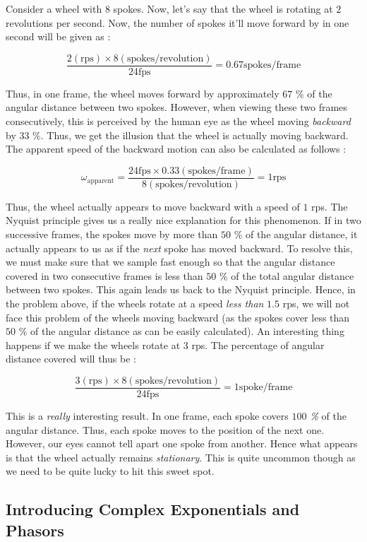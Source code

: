 \documentclass{article}
\theoremstyle{definition}
\begin{document}
		Consider a wheel with $8$ spokes. Now, let's say that the wheel is rotating at $2$ revolutions per second. Now, the number of spokes it'll move forward by in one second will be given as :
		
		\[ \frac{2(\text{rps}) \times 8(\text{spokes/revolution})}{24 \text{fps}} = 0.67 \text{spokes/frame} \]
		
		Thus, in one frame, the wheel moves forward by approximately $67$ \% of the angular distance between two spokes. However, when viewing these two frames consecutively, this is perceived by the human eye as the wheel moving \textit{backward} by $33$ \%. Thus, we get the illusion that the wheel is actually moving backward. The apparent speed of the backward motion can also be calculated as follows : 

\[ 
	\omega_{\text{apparent}} = \frac{24 \text{fps} \times 0.33 (\text{spokes/frame})}{8 (\text{spokes/revolution})} = 1 \text{rps} 
\]	

Thus, the wheel actually appears to move backward with a speed of $1$ rps. The Nyquist principle gives us a really nice explanation for this phenomenon. If in two successive frames, the spokes move by more than $50$ \% of the angular distance, it actually appears to us as if the \textit{next} spoke has moved backward. To resolve this, we must make sure that we sample fast enough so that the angular distance covered in two consecutive frames is less than $50$ \% of the total angular distance between two spokes. This again leads us back to the Nyquist principle. Hence, in the problem above, if the wheels rotate at a speed \textit{less than} $1.5$ rps, we will not face this problem of the wheels moving backward (as the spokes cover less than $50$ \% of the angular distance as can be easily calculated). An interesting thing happens if we make the wheels rotate at $3$ rps. The percentage of angular distance covered will thus be :

\[ 
	\frac{3(\text{rps}) \times 8(\text{spokes/revolution})}{24 \text{fps}} = 1 \text{spoke/frame}
\]
		
		This is a \textit{really} interesting result. In one frame, each spoke covers \textit{$100$ \%} of the angular distance. Thus, each spoke moves to the position of the next one. However, our eyes cannot tell apart one spoke from another. Hence what appears is that the wheel actually remains \textit{stationary}. This is quite uncommon though as we need to be quite lucky to hit this sweet spot.
		
		\subsection{Introducing Complex Exponentials and Phasors}
		
\end{document}
